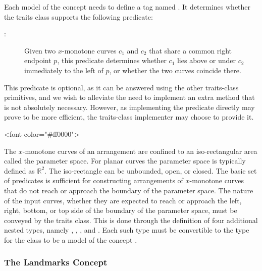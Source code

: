Each model of the concept 
needs to define a tag named . It determines
whether the traits class supports the following predicate:
\begin{description}
\item[:]
  Given two $x$-monotone curves $c_1$ and $c_2$ that share a common
  right endpoint $p$, this predicate determines whether $c_1$ lies
  above or under $c_2$ immediately to the left of $p$, or whether the
  two curves coincide there.
\end{description}
This predicate is optional, as it can be answered using the
other traits-class primitives, and we wish to alleviate the
need to implement an extra method that is not absolutely
necessary. However, as implementing the predicate directly
may prove to be more efficient, the traits-class
implementer may choose to provide it.

\lcTex{\color{red}}
\begin{ccHtmlOnly}
<font color="#ff0000">
\end{ccHtmlOnly}
The $x$-monotone curves of an arrangement are confined to an
iso-rectangular area called the parameter space. For planar curves the
parameter space is typically defined as $\mathbb{R}^2$. The
iso-rectangle can be unbounded, open, or closed. The basic set of
predicates is sufficient for constructing arrangements of $x$-monotone
curves that do not reach or approach the boundary of the parameter
space. The nature of the input curves, whether they are expected to
reach or approach the left, right, bottom, or top side of the boundary
of the parameter space, must be conveyed by the traits class. This is
done through the definition of four additional nested types, namely
, ,
, and . Each such
type must be convertible to the type  for
the class to be a model of the concept .
\lcTex{\color{black}}

\subsubsection{The Landmarks Concept
\label{arr_sssec:tr_lanmarks_concept}}

